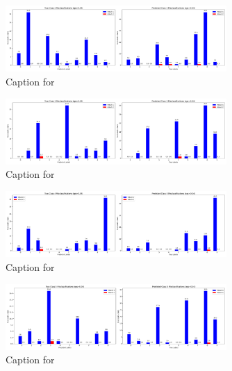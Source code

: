 \documentclass{article}
\begin{document}
\begin{figure}[!htbp]
\centering
\includegraphics[width=0.75\textwidth]{combined_class_boundary_pgd/combined_class_2_misclassifications_eps_0.04.png}
\caption{Caption for }
\label{fig:combined_class_2_misclassifications_eps_0.04.png}
\end{figure}


\begin{figure}[!htbp]
\centering
\includegraphics[width=0.75\textwidth]{combined_class_boundary_pgd/combined_class_3_misclassifications_eps_0.04.png}
\caption{Caption for }
\label{fig:combined_class_3_misclassifications_eps_0.04.png}
\end{figure}

\begin{figure}[!htbp]
\centering
\includegraphics[width=0.75\textwidth]{combined_class_boundary_pgd/combined_class_4_misclassifications_eps_0.04.png}
\caption{Caption for }
\label{fig:combined_class_4_misclassifications_eps_0.04.png}
\end{figure}

\begin{figure}[!htbp]
\centering
\includegraphics[width=0.75\textwidth]{combined_class_boundary_pgd/combined_class_5_misclassifications_eps_0.04.png}
\caption{Caption for }
\label{fig:combined_class_5_misclassifications_eps_0.04.png}
\end{figure}
\end{document}
